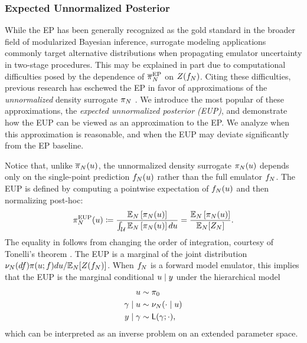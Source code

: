 \documentclass[12pt]{article}
\begin{document}
\subsubsection{Expected Unnormalized Posterior}
 While the EP has been generally recognized as the gold standard 
 in the broader field of modularized Bayesian inference, surrogate 
 modeling applications commonly target alternative distributions when 
 propagating emulator uncertainty in two-stage procedures. This may 
 be explained in part due to computational difficulties posed by 
 the dependence of $\overline{\pi}_{N}^{\mathrm{EP}}$ on $Z(f_{N})$.
Citing these difficulties, previous research has 
eschewed the EP in favor of approximations of the \textit{unnormalized}
density surrogate $\pi_{N}$ \citep{StuartTeck1,StuartTeck2,VehtariParallelGP}.
We introduce the most popular of these approximations, the 
\textit{expected unnormalized posterior (EUP)}, and demonstrate 
how the EUP can be viewed as an approximation to the EP. We analyze when 
this approximation is reasonable, and when the EUP may deviate significantly 
from the EP baseline.

Notice that, unlike $\overline{\pi}_{N}(u)$, the unnormalized density surrogate
$\pi_{N}(u)$ depends only on the single-point prediction $f_{N}(u)$
rather than the full emulator $f_{N}$. The EUP is defined by computing
a pointwise expectation of $f_{N}(u)$ and then normalizing post-hoc:
\begin{equation}
\pi_{N}^{\mathrm{EUP}}(u) \coloneqq 
\frac{\mathbb{E}_{N}\left[\pi_{N}(u) \right]}{\int_{\mathcal{U}} \mathbb{E}_{N}\left[\pi_{N}(u) \right] du}
= \frac{\mathbb{E}_{N}\left[\pi_{N}(u) \right]}{\mathbb{E}_{N}[Z_{N}]}. \label{eq:post-approx-EL} 
\end{equation}
The equality in  follows from
changing the order of integration, courtesy of Tonelli's theorem \citep{StuartTeck1}. The EUP
is a marginal of the joint distribution 
$\nu_{N}(df) \pi(u; f)du / \mathbb{E}_{N}[Z(f_{N})]$. 
When $f_{N}$ is a forward model emulator, this implies that the EUP is the 
marginal conditional $u \mid y$ under the hierarchical model 
\begin{align}
u &\sim \pi_0 \label{eq:el-prob-model} \\
\gamma \mid u &\sim \nu_{N}(\cdot \mid u) \nonumber \\
y \mid \gamma &\sim \mathsf{L}(\gamma; \cdot), \nonumber
\end{align}
which can be interpreted as an inverse problem on an extended parameter space.
\end{document}
